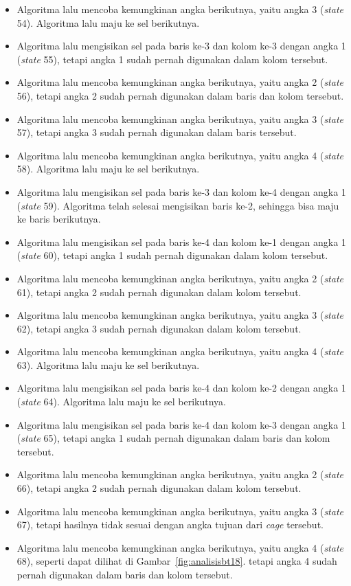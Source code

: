 \documentclass[a4paper,twoside]{article}
\begin{document}
\begin{enumerate}
\begin{itemize}
\item Algoritma lalu mencoba kemungkinan angka berikutnya, yaitu angka 3 (\textit{state} 54). Algoritma lalu maju ke sel berikutnya.
\item Algoritma lalu mengisikan sel pada baris ke-3 dan kolom ke-3 dengan angka 1 (\textit{state} 55), tetapi angka 1 sudah pernah digunakan dalam kolom tersebut.
\item Algoritma lalu mencoba kemungkinan angka berikutnya, yaitu angka 2 (\textit{state} 56), tetapi angka 2 sudah pernah digunakan dalam baris dan kolom tersebut.
\item Algoritma lalu mencoba kemungkinan angka berikutnya, yaitu angka 3 (\textit{state} 57), tetapi angka 3 sudah pernah digunakan dalam baris tersebut.
\item Algoritma lalu mencoba kemungkinan angka berikutnya, yaitu angka 4 (\textit{state} 58). Algoritma lalu maju ke sel berikutnya.
\item Algoritma lalu mengisikan sel pada baris ke-3 dan kolom ke-4 dengan angka 1 (\textit{state} 59). Algoritma telah selesai mengisikan baris ke-2, sehingga bisa maju ke baris berikutnya.
\item Algoritma lalu mengisikan sel pada baris ke-4 dan kolom ke-1 dengan angka 1 (\textit{state} 60), tetapi angka 1 sudah pernah digunakan dalam kolom tersebut.
\item Algoritma lalu mencoba kemungkinan angka berikutnya, yaitu angka 2 (\textit{state} 61), tetapi angka 2 sudah pernah digunakan dalam kolom tersebut.
\item Algoritma lalu mencoba kemungkinan angka berikutnya, yaitu angka 3 (\textit{state} 62), tetapi angka 3 sudah pernah digunakan dalam kolom tersebut.
\item Algoritma lalu mencoba kemungkinan angka berikutnya, yaitu angka 4 (\textit{state} 63). Algoritma lalu maju ke sel berikutnya.
\item Algoritma lalu mengisikan sel pada baris ke-4 dan kolom ke-2 dengan angka 1 (\textit{state} 64). Algoritma lalu maju ke sel berikutnya.
\item Algoritma lalu mengisikan sel pada baris ke-4 dan kolom ke-3 dengan angka 1 (\textit{state} 65), tetapi angka 1 sudah pernah digunakan dalam baris dan kolom tersebut.
\item Algoritma lalu mencoba kemungkinan angka berikutnya, yaitu angka 2 (\textit{state} 66), tetapi angka 2 sudah pernah digunakan dalam kolom tersebut.
\item Algoritma lalu mencoba kemungkinan angka berikutnya, yaitu angka 3 (\textit{state} 67), tetapi hasilnya tidak sesuai dengan angka tujuan dari \textit{cage} tersebut.
\item Algoritma lalu mencoba kemungkinan angka berikutnya, yaitu angka 4 (\textit{state} 68), seperti dapat dilihat di Gambar~\ref{fig:analisisbt18}. tetapi angka 4 sudah pernah digunakan dalam baris dan kolom tersebut.


\end{itemize}
\end{enumerate}
\end{document}
